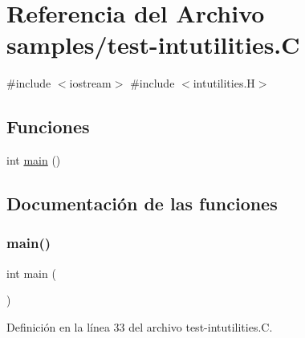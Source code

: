 \hypertarget{test-intutilities_8_c}{}\section{Referencia del Archivo samples/test-\/intutilities.C}
\label{test-intutilities_8_c}
{\ttfamily \#include $<$iostream$>$}\newline
{\ttfamily \#include $<$intutilities.\+H$>$}\newline
\subsection*{Funciones}
\begin{DoxyCompactItemize}
\item 
int \hyperlink{test-intutilities_8_c_ae66f6b31b5ad750f1fe042a706a4e3d4}{main} ()
\end{DoxyCompactItemize}


\subsection{Documentación de las funciones}
\mbox{\label{test-intutilities_8_c_ae66f6b31b5ad750f1fe042a706a4e3d4}} 
\subsubsection{\texorpdfstring{main()}{main()}}
{\footnotesize\ttfamily int main (\begin{DoxyParamCaption}{ }\end{DoxyParamCaption})}



Definición en la línea 33 del archivo test-\/intutilities.\+C.

